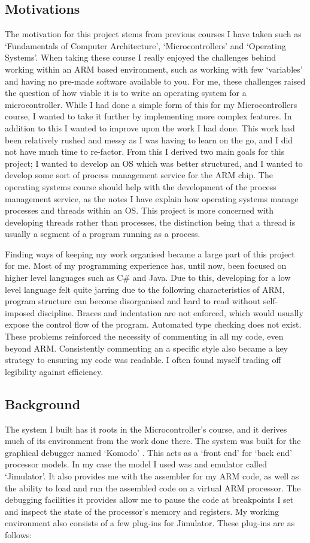 \label{motivations}
\subsection{Motivations}
The motivation for this project stems from previous courses I have taken such as `Fundamentals of Computer Architecture', `Microcontrollers' and `Operating Systems'. When taking these course I really enjoyed the challenges behind working within an ARM based environment, such as working with few `variables' and having no pre-made software available to you. For me, these challenges raised the question of how viable it is to write an operating system for a microcontroller.
While I had done a simple form of this for my Microcontrollers course, I wanted to take it further by implementing more complex features. In addition to this I wanted to improve upon the work I had done. This work had been relatively rushed and messy as I was having to learn on the go, and I did not have much time to re-factor. From this I derived two main goals for this project; I wanted to develop an OS which was better structured, and I wanted to develop some sort of process management service for the ARM chip. The operating systems course should help with the development of the process management service, as the notes I have explain how operating systems manage processes and threads within an OS. This project is more concerned with developing threads rather than processes, the distinction being that a thread is usually a segment of a program running as a process. 

Finding ways of keeping my work organised became a large part of this project for me. Most of my programming experience has, until now, been focused on higher level languages such as C\# and Java. Due to this, developing for a low level language felt quite jarring due to the following characteristics of ARM, program structure can become disorganised and hard to read without self-imposed discipline. Braces and indentation are not enforced, which would usually expose the control flow of the program. Automated type checking does not exist. These problems reinforced the necessity of commenting in all my code, even beyond ARM. Consistently commenting an a specific style also became a key strategy to ensuring my code was readable. I often found myself trading off legibility against efficiency.

\subsection{Background}
The system I built has it roots in the Microcontroller's course, and it derives much of its environment from the work done there. The system was built for the graphical debugger named `Komodo' \cite{kmd}. This acts as a `front end' for `back end' processor models. In my case the model I used was  and emulator called `Jimulator'. It also provides me with the assembler for my ARM code, as well as the ability to load and run the assembled code on a virtual ARM processor. The debugging facilities it provides allow me to pause the code at breakpoints I set and inspect the state of the processor's memory and registers. My working environment also consists of a few plug-ins for Jimulator. These plug-ins are as follows:


